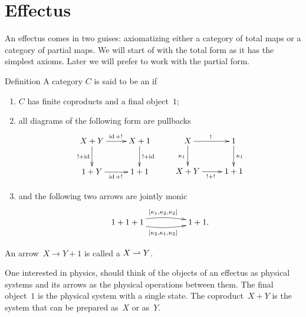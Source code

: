 \documentclass[b]{subfiles}
\begin{document}
\section{Effectus}
An effectus comes in two guises:
    axiomatizing either a category of total maps
    or a category of partial maps.
We will start of with the total form as it has the simplest axioms.
Later we will prefer to work with the partial form.
\begin{parsec}%
\begin{point}{Definition}%
A category $C$ is said to be an 
    \cite{effintro,newdirections,statesofconvexsets}
    if
\begin{enumerate}
\item $C$ has finite coproducts and a final object~$1$;
\item all diagrams of the following form are pullbacks
\begin{equation}\label{pullbacks}
\xymatrix{
    X+Y \ar[r]^{\id+!} \ar[d]_{!+\id} & X+1\ar[d]^{!+\id} \\
    1+Y\ar[r]_{\id+!} & 1+1
    }
    \qquad
\xymatrix{
    X \ar[r]^{!} \ar[d]_{\kappa_1} & 1 \ar[d]^{\kappa_1} \\
    X+Y\ar[r]_{!+!} & 1+1
    }
\end{equation}
\item\label{eff-joint-monicity} and the following two arrows are jointly monic
    \begin{equation*}
        \xymatrix@C+2pc  {
            1+1+1  \ar@/^/[r]^{[\kappa_1,\kappa_2,\kappa_2]}
                    \ar@/_/[r]_{[\kappa_2,\kappa_1,\kappa_2]} & 1+1.
        }
    \end{equation*}
\end{enumerate}
An arrow~$X \to Y+1$ is called a 
$X \mathrel{\Define{\pto}} Y$.
\begin{point}%
One interested in physics, should think of the objects
    of an effectus as physical systems and its arrows as
    the physical operations between them.
    The final object~$1$ is the physical system with a single state.
The coproduct~$X+Y$ is the system that can be prepared as~$X$ or as~$Y$.


\end{point}
\end{point}
\end{parsec}
\end{document}
